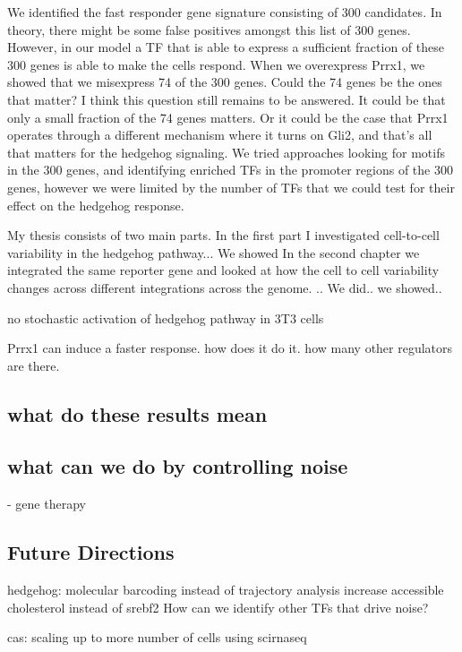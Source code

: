 We identified the fast responder gene signature consisting of 300 candidates. In theory, there might be some false positives amongst this list of 300 genes. However, in our model a TF that is able to express a sufficient fraction of these 300 genes is able to make the cells respond. When we overexpress Prrx1, we showed that we misexpress 74 of the 300 genes. Could the 74 genes be the ones that matter? I think this question still remains to be answered. It could be that only a small fraction of the 74 genes matters. Or it could be the case that Prrx1 operates through a different mechanism where it turns on Gli2, and that's all that matters for the hedgehog signaling. We tried approaches looking for motifs in the 300 genes, and identifying enriched TFs in the promoter regions of the 300 genes, however we were limited by the number of TFs that we could test for their effect on the hedgehog response. 




My thesis consists of two main parts. 
In the first part I investigated cell-to-cell variability in the hedgehog pathway... We showed
In the second chapter we integrated the same reporter gene and looked at how the cell to cell variability changes across 
different integrations across the genome. .. We did.. we showed.. 

no stochastic activation of hedgehog pathway in 3T3 cells

Prrx1 can induce a faster response. how does it do it. how many other regulators are there.

\subsection{what do these results mean}


\subsection{what can we do by controlling noise}
- gene therapy

\subsection{Future Directions}
hedgehog:
molecular barcoding instead of trajectory analysis
increase accessible cholesterol instead of srebf2
How can we identify other TFs that drive noise?



cas:
scaling up to more number of cells using scirnaseq


